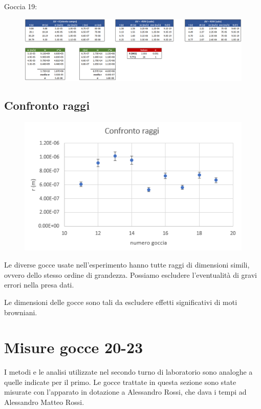 \documentclass{article}
\begin{document}
\vspace{10mm}

Goccia 19:

\begin{figure}[h]
\centering
\includegraphics[width=\linewidth]{Goccia19}
\end{figure}

\subsection{Confronto raggi}

\begin{figure}[h]
\centering
\includegraphics[width=0.6\linewidth]{Confronto_r_2}
\end{figure}

Le diverse gocce usate nell'esperimento hanno tutte raggi di dimensioni simili, ovvero dello stesso ordine di grandezza. Possiamo escludere l'eventualità di gravi errori nella presa dati.

Le dimensioni delle gocce sono tali da escludere effetti significativi di moti browniani.

\pagebreak

\section{Misure gocce 20-23}

I metodi e le analisi utilizzate nel secondo turno di laboratorio sono analoghe a quelle indicate per il primo. Le gocce trattate in questa sezione sono state misurate con l'apparato in dotazione a Alessandro Rossi, che dava i tempi ad Alessandro Matteo Rossi.
\end{document}
